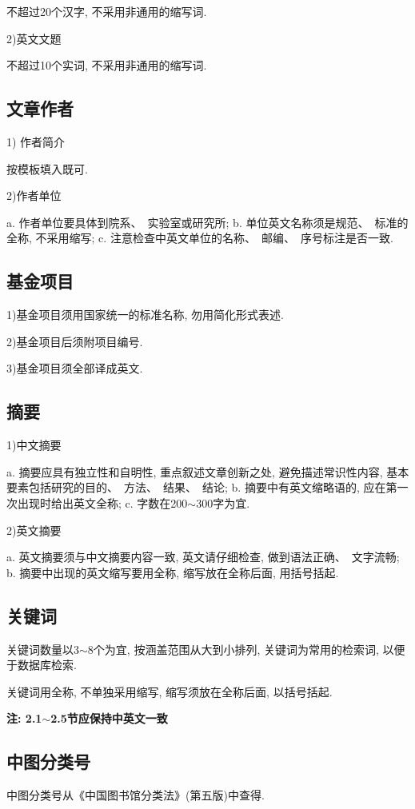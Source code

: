 \documentclass{setp-new}
\begin{document}
不超过20个汉字, 不采用非通用的缩写词.

2)英文文题　

不超过10个实词, 不采用非通用的缩写词.

\subsection{文章作者}


1) 作者简介　

按模板填入既可.

2)作者单位
　　

a. 作者单位要具体到院系、~实验室或研究所;
b. 单位英文名称须是规范、~标准的全称, 不采用缩写;
c. 注意检查中英文单位的名称、~邮编、~序号标注是否一致.


\subsection{基金项目}


1)基金项目须用国家统一的标准名称, 勿用简化形式表述.

2)基金项目后须附项目编号.

3)基金项目须全部译成英文.

\subsection{摘要}


1)中文摘要

a. 摘要应具有独立性和自明性, 重点叙述文章创新之处, 避免描述常识性内容, 基本要素包括研究的目的、~方法、~结果、~结论;
b. 摘要中有英文缩略语的, 应在第一次出现时给出英文全称;
c. 字数在200$\sim$300字为宜.
　　

2)英文摘要
　　　

a. 英文摘要须与中文摘要内容一致, 英文请仔细检查, 做到语法正确、~文字流畅;
b. 摘要中出现的英文缩写要用全称, 缩写放在全称后面, 用括号括起.

\subsection{关键词}

关键词数量以3$\sim$8个为宜, 按涵盖范围从大到小排列, 关键词为常用的检索词, 以便于数据库检索.

关键词用全称, 不单独采用缩写, 缩写须放在全称后面, 以括号括起.

\textbf{注: 2.1$\sim $2.5节应保持中英文一致}



\subsection{中图分类号}
中图分类号从《中国图书馆分类法》(第五版)中查得.
\end{document}
